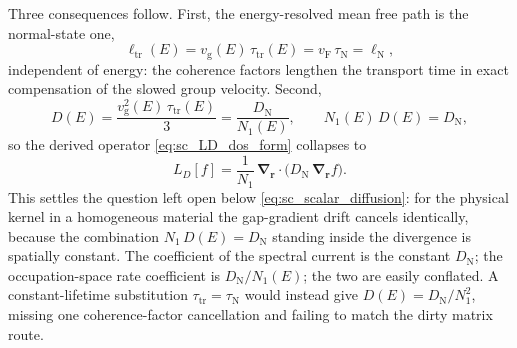 \documentclass[
  aps,
  prb,
  preprint,
  superscriptaddress,
  longbibliography,
  nofootinbib
]{revtex4-2}
\newcommand{\br}{\mathbf{r}}
\newcommand{\bnabla}{\boldsymbol{\nabla}}
\newcommand{\vF}{v_{\mathrm{F}}}
\newcommand{\vg}{v_{\mathrm{g}}}
\newcommand{\tautr}{\tau_{\mathrm{tr}}}
\newcommand{\elltr}{\ell_{\mathrm{tr}}}
\newcommand{\DOS}{N_1}
\newcommand{\DN}{D_{\mathrm{N}}}
\newcommand{\DE}{D(E)}
\newcommand{\LD}{L_D}
\begin{document}
Three consequences follow. First, the energy-resolved mean free path
is the normal-state one,
\begin{equation}
  \elltr(E)
  =
  \vg(E)\,\tautr(E)
  =
  \vF\,\tau_{\mathrm N}
  =
  \ell_{\mathrm N},
  \label{eq:sc_mfp_identity}
\end{equation}
independent of energy: the coherence factors lengthen the transport
time in exact compensation of the slowed group velocity. Second,
\begin{equation}
  \DE
  =
  \frac{\vg^{2}(E)\,\tautr(E)}{3}
  =
  \frac{\DN}{\DOS(E)},
  \qquad
  \DOS(E)\,\DE
  =
  \DN,
  \label{eq:sc_ND_identity}
\end{equation}
so the derived operator \cref{eq:sc_LD_dos_form} collapses to
\begin{equation}
  \LD[f]
  =
  \frac{1}{\DOS}\,
  \bnabla_{\br}\cdot
  \bigl(
    \DN\,
    \bnabla_{\br} f
  \bigr).
  \label{eq:sc_LD_closed}
\end{equation}
This settles the question left open below
\cref{eq:sc_scalar_diffusion}: for the physical kernel in a
homogeneous material the gap-gradient drift cancels identically,
because the combination \(\DOS\,\DE=\DN\) standing inside the
divergence is spatially constant. The coefficient of the spectral
current is the constant \(\DN\); the occupation-space rate coefficient
is \(\DN/\DOS(E)\); the two are easily conflated. A constant-lifetime
substitution \(\tautr=\tau_{\mathrm N}\) would instead give
\(\DE=\DN/\DOS^{2}\), missing one coherence-factor cancellation and
failing to match the dirty matrix route.
\end{document}
